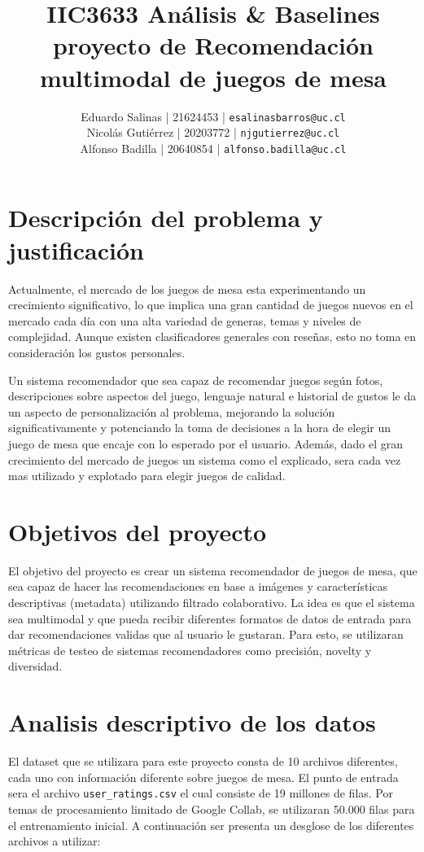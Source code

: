 \documentclass[11pt]{article}
\title{IIC3633  Análisis \& Baselines proyecto de Recomendación multimodal de juegos de mesa}
\author{\normalfont 
Eduardo Salinas | 21624453 | \texttt{esalinasbarros@uc.cl} \\
Nicolás Gutiérrez | 20203772 | \texttt{njgutierrez@uc.cl} \\
Alfonso Badilla | 20640854 | \texttt{alfonso.badilla@uc.cl} \\
}
\begin{document}
\maketitle
\newpage

\section{Descripción del problema y justificación}
Actualmente, el mercado de los juegos de mesa esta experimentando un crecimiento significativo, lo que implica una gran cantidad de juegos nuevos en el mercado cada día con una alta variedad de generas, temas y niveles de complejidad. Aunque existen clasificadores generales con reseñas, esto no toma en consideración los gustos personales. 

Un sistema recomendador que sea capaz de recomendar juegos según fotos, descripciones sobre aspectos del juego, lenguaje natural e historial de gustos le da un aspecto de personalización al problema, mejorando la solución significativamente y potenciando la toma de decisiones a la hora de elegir un juego de mesa que encaje con lo esperado por el usuario. Además, dado el gran crecimiento del mercado de juegos un sistema como el explicado, sera cada vez mas utilizado y explotado para elegir juegos de calidad.

\section{Objetivos del proyecto}
El objetivo del proyecto es crear un sistema recomendador de juegos de mesa, que sea capaz de hacer las recomendaciones en base a imágenes y características descriptivas (metadata) utilizando filtrado colaborativo. La idea es que el sistema sea multimodal y que pueda recibir diferentes formatos de datos de entrada para dar recomendaciones validas que al usuario le gustaran. Para esto, se utilizaran métricas de testeo de sistemas recomendadores como precisión, novelty y diversidad.

\section{Analisis descriptivo de los datos}
El dataset que se utilizara para este proyecto consta de 10 archivos diferentes, cada uno con información diferente sobre juegos de mesa. El punto de entrada sera el archivo \texttt{user\_ratings.csv} el cual consiste de 19 millones de filas. Por temas de procesamiento limitado de Google Collab, se utilizaran 50.000 filas para el entrenamiento  inicial. A continuación ser presenta un desglose de los diferentes archivos a utilizar:
\end{document}

